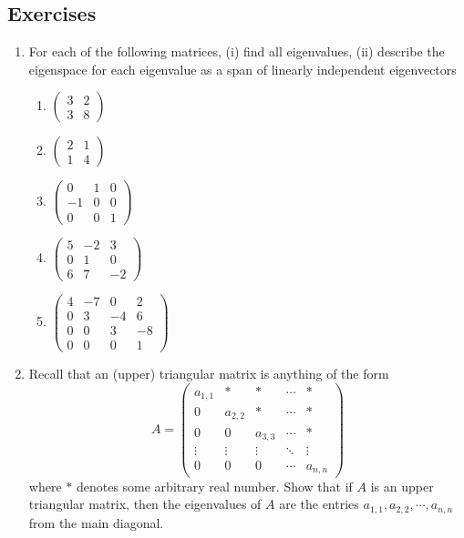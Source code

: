 \documentclass[12pt]{article}
\numberwithin{equation}{subsection}
\numberwithin{figure}{subsection}
\theoremstyle{note}
\begin{document}
\subsection{Exercises} \label{sec-ex-eig} 
\begin{enumerate}[label=\arabic*.]

	\item For each of the following matrices, (i) find all eigenvalues, (ii) describe the eigenspace for each eigenvalue as a span of linearly independent eigenvectors
	\begin{enumerate}
		\item $\begin{pmatrix} 3 & 2 \\ 3 & 8\end{pmatrix}$
		\item $\begin{pmatrix} 2 & 1 \\ 1 & 4\end{pmatrix}$
		\item $\begin{pmatrix} 0 & 1 & 0 \\ -1 & 0 & 0 \\ 0 & 0 & 1 \end{pmatrix}$
		\item $\begin{pmatrix} 5 & -2 & 3 \\ 0 & 1 & 0 \\ 6 & 7 & -2 \end{pmatrix}$
		\item $\begin{pmatrix} 4 & -7 & 0 & 2 \\
		0 & 3 & -4 & 6 \\
		0 & 0 &3 & -8\\
		0 & 0 & 0 & 1\end{pmatrix}$
	\end{enumerate}
	\item Recall that an (upper) triangular matrix is anything of the form \[ A=\begin{pmatrix} a_{1,1} & * & * & \cdots & * \\
0 & a_{2,2} & * & \cdots & * \\
0 & 0 & a_{3,3} & \cdots & * \\
\vdots & \vdots & \vdots & \ddots & \vdots \\
0 & 0 & 0 & \cdots & a_{n,n} \end{pmatrix}\]
where $*$ denotes some arbitrary real number. Show that if $A$ is an upper triangular matrix, then the eigenvalues of $A$ are the entries $a_{1,1},a_{2,2},\cdots, a_{n,n}$ from the main diagonal. 


\end{enumerate}
\end{document}
